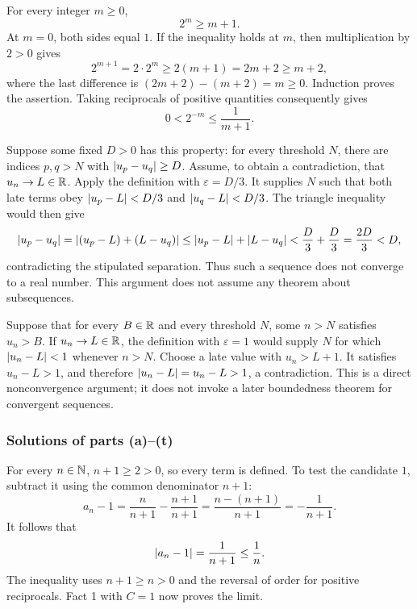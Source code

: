 For every integer $m\geq0$,
\[
 2^m\geq m+1.
\]
At $m=0$, both sides equal $1$. If the inequality holds at $m$,
then multiplication by $2>0$ gives
\[
 2^{m+1}=2\cdot2^m\geq2(m+1)=2m+2\geq m+2,
\]
where the last difference is $(2m+2)-(m+2)=m\geq0$.
Induction proves the assertion. Taking reciprocals of positive
quantities consequently gives
\[
 0<2^{-m}\leq\frac1{m+1}.
\]

Suppose some fixed $D>0$ has this property: for every threshold
$N$, there are indices $p,q>N$ with $\left|u_p-u_q\right|\geq D$.
Assume, to obtain a contradiction, that $u_n\to L\in\mathbb{R}$.
Apply the definition with $\varepsilon=D/3$. It supplies $N$ such
that both late terms obey
$\left|u_p-L\right|<D/3$ and $\left|u_q-L\right|<D/3$. The triangle inequality
would then give
\[
 \left|u_p-u_q\right|
 =\left|(u_p-L)+(L-u_q)\right|
 \leq\left|u_p-L\right|+\left|L-u_q\right|
 <\frac D3+\frac D3=\frac{2D}{3}<D,
\]
contradicting the stipulated separation. Thus such a sequence
does not converge to a real number. This argument does not assume
any theorem about subsequences.

Suppose that for every $B\in\mathbb{R}$ and every threshold $N$, some
$n>N$ satisfies $u_n>B$. If $u_n\to L\in\mathbb{R}$, the definition
with $\varepsilon=1$ would supply $N$ for which
$\left|u_n-L\right|<1$ whenever $n>N$. Choose a late value with
$u_n>L+1$. It satisfies $u_n-L>1$, and therefore
$\left|u_n-L\right|=u_n-L>1$, a contradiction. This is a direct
nonconvergence argument; it does not invoke a later boundedness
theorem for convergent sequences.

\subsubsection*{Solutions of parts (a)--(t)}

For every $n\in\mathbb{N}$, $n+1\geq2>0$, so every term is defined.
To test the candidate $1$, subtract it using the common denominator
$n+1$:
\[
 a_n-1=\frac n{n+1}-\frac{n+1}{n+1}
 =\frac{n-(n+1)}{n+1}
 =-\frac1{n+1}.
\]
It follows that
\[
 \left|a_n-1\right|=\frac1{n+1}\leq\frac1n.
\]
The inequality uses $n+1\geq n>0$ and the reversal of order for
positive reciprocals. Fact 1 with $C=1$ now proves the limit.


